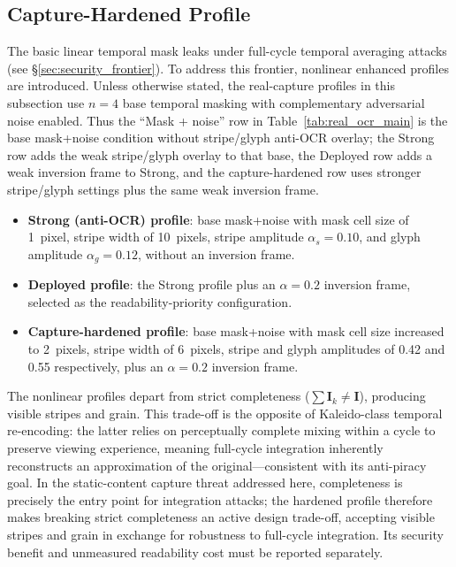 \documentclass{ieeeaccess}
\begin{document}
\subsection{Capture-Hardened Profile}
\label{sec:hardened}

The basic linear temporal mask leaks under full-cycle temporal averaging attacks (see \S\ref{sec:security_frontier}). To address this frontier, nonlinear enhanced profiles are introduced. Unless otherwise stated, the real-capture profiles in this subsection use $n=4$ base temporal masking with complementary adversarial noise enabled. Thus the ``Mask + noise'' row in Table~\ref{tab:real_ocr_main} is the base mask+noise condition without stripe/glyph anti-OCR overlay; the Strong row adds the weak stripe/glyph overlay to that base, the Deployed row adds a weak inversion frame to Strong, and the capture-hardened row uses stronger stripe/glyph settings plus the same weak inversion frame.
\begin{itemize}
\item \textbf{Strong (anti-OCR) profile}: base mask+noise with mask cell size of 1~pixel, stripe width of 10~pixels, stripe amplitude $\alpha_s=0.10$, and glyph amplitude $\alpha_g=0.12$, without an inversion frame.

\item \textbf{Deployed profile}: the Strong profile plus an $\alpha=0.2$ inversion frame, selected as the readability-priority configuration.

\item \textbf{Capture-hardened profile}: base mask+noise with mask cell size increased to 2~pixels, stripe width of 6~pixels, stripe and glyph amplitudes of 0.42 and 0.55 respectively, plus an $\alpha=0.2$ inversion frame.
\end{itemize}

The nonlinear profiles depart from strict completeness ($\sum\mathbf{I}_k \neq \mathbf{I}$), producing visible stripes and grain. This trade-off is the opposite of Kaleido-class temporal re-encoding: the latter relies on perceptually complete mixing within a cycle to preserve viewing experience, meaning full-cycle integration inherently reconstructs an approximation of the original---consistent with its anti-piracy goal. In the static-content capture threat addressed here, completeness is precisely the entry point for integration attacks; the hardened profile therefore makes breaking strict completeness an active design trade-off, accepting visible stripes and grain in exchange for robustness to full-cycle integration. Its security benefit and unmeasured readability cost must be reported separately.
\end{document}
